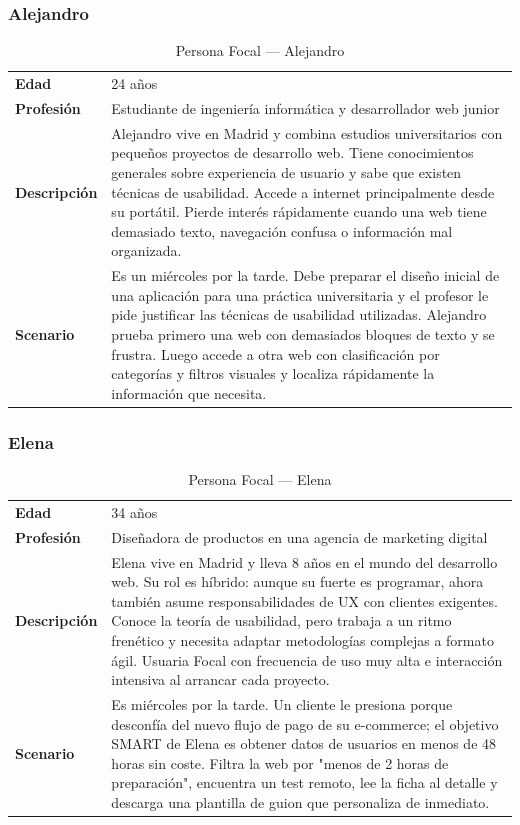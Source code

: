 \documentclass[12pt, a4paper]{report}
\begin{document}
\subsubsection{Alejandro}

\begin{table}[H]
\centering
\begin{tabularx}{\linewidth}{lX}
\toprule
\textbf{Edad} & 24 años \\
\textbf{Profesión} & Estudiante de ingeniería informática y desarrollador web junior \\
\midrule
\textbf{Descripción} &
Alejandro vive en Madrid y combina estudios universitarios con pequeños proyectos de desarrollo
web. Tiene conocimientos generales sobre experiencia de usuario y sabe que existen técnicas de
usabilidad. Accede a internet principalmente desde su portátil. Pierde interés rápidamente cuando
una web tiene demasiado texto, navegación confusa o información mal organizada. \\[4pt]
\textbf{Scenario} &
Es un miércoles por la tarde. Debe preparar el diseño inicial de una aplicación para una práctica
universitaria y el profesor le pide justificar las técnicas de usabilidad utilizadas. Alejandro prueba
primero una web con demasiados bloques de texto y se frustra. Luego accede a otra web con
clasificación por categorías y filtros visuales y localiza rápidamente la información que necesita. \\
\bottomrule
\end{tabularx}
\caption{Persona Focal — Alejandro}
\end{table}

\subsubsection{Elena}

\begin{table}[H]
\centering
\begin{tabularx}{\linewidth}{lX}
\toprule
\textbf{Edad} & 34 años \\
\textbf{Profesión} & Diseñadora de productos en una agencia de marketing digital \\
\midrule
\textbf{Descripción} &
Elena vive en Madrid y lleva 8 años en el mundo del desarrollo web. Su rol es híbrido: aunque su
fuerte es programar, ahora también asume responsabilidades de UX con clientes exigentes. Conoce
la teoría de usabilidad, pero trabaja a un ritmo frenético y necesita adaptar metodologías complejas
a formato ágil. Usuaria Focal con frecuencia de uso muy alta e interacción intensiva al arrancar cada
proyecto. \\[4pt]
\textbf{Scenario} &
Es miércoles por la tarde. Un cliente le presiona porque desconfía del nuevo flujo de pago de su
e-commerce; el objetivo SMART de Elena es obtener datos de usuarios en menos de 48 horas
sin coste. Filtra la web por "menos de 2 horas de preparación", encuentra un test remoto, lee la
ficha al detalle y descarga una plantilla de guion que personaliza de inmediato. \\
\bottomrule
\end{tabularx}
\caption{Persona Focal — Elena}
\end{table}
\end{document}
